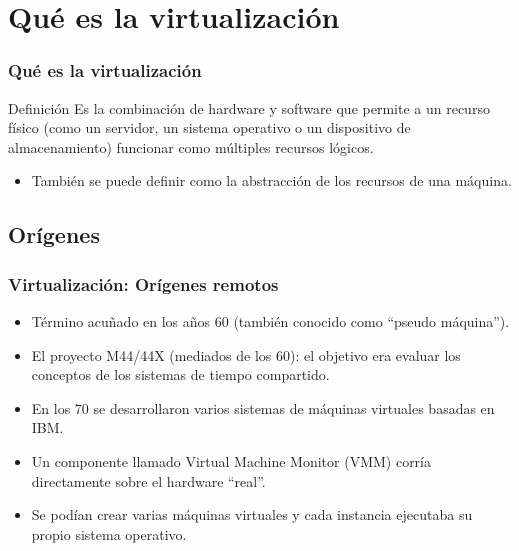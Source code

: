\documentclass{beamer}
\begin{document}



\section{Qué es la virtualización}

\begin{frame}
\frametitle{Qué es la virtualización}

\begin{block}{Definición}
Es la combinación de hardware y software que permite a un \alert{recurso físico} (como un servidor, un sistema operativo o un dispositivo de almacenamiento) funcionar como \alert{múltiples recursos lógicos}.
\end{block}

\begin{itemize}
\item También se puede definir como la \alert{abstracción} de los recursos de una máquina.
\end{itemize}

\end{frame}


\subsection{Orígenes}

\begin{frame}
\frametitle{Virtualización: Orígenes remotos}

\begin{itemize}
\item Término acuñado en los años 60 (también conocido como ``pseudo máquina'').
\item El proyecto M44/44X (mediados de los 60): el objetivo era evaluar los conceptos de los sistemas de tiempo compartido.
\item En los 70 se desarrollaron varios sistemas de máquinas virtuales basadas en IBM.
\item Un componente llamado \alert{Virtual Machine Monitor (VMM)} corría directamente sobre el hardware ``real''.
\item Se podían crear varias máquinas virtuales y cada instancia ejecutaba su propio sistema operativo.
\end{itemize}

\end{frame}
\end{document}
